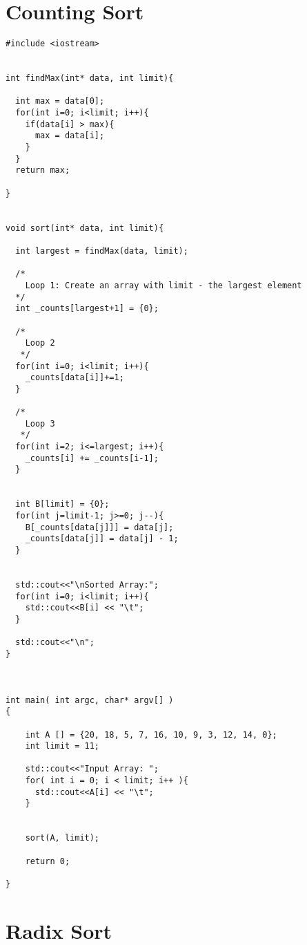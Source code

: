 \documentclass{article}
\begin{document}
\section{Counting Sort}
\begin{verbatim}
#include <iostream>


int findMax(int* data, int limit){

  int max = data[0];
  for(int i=0; i<limit; i++){
    if(data[i] > max){
      max = data[i];
    }
  }
  return max;
  
}


void sort(int* data, int limit){

  int largest = findMax(data, limit);

  /*
    Loop 1: Create an array with limit - the largest element
  */
  int _counts[largest+1] = {0};

  /*
    Loop 2
   */
  for(int i=0; i<limit; i++){
    _counts[data[i]]+=1;
  }

  /*
    Loop 3
   */
  for(int i=2; i<=largest; i++){
    _counts[i] += _counts[i-1];
  }


  int B[limit] = {0};
  for(int j=limit-1; j>=0; j--){
    B[_counts[data[j]]] = data[j];
    _counts[data[j]] = data[j] - 1;
  }


  std::cout<<"\nSorted Array:";
  for(int i=0; i<limit; i++){
    std::cout<<B[i] << "\t";
  }

  std::cout<<"\n";
}



int main( int argc, char* argv[] )
{

    int A [] = {20, 18, 5, 7, 16, 10, 9, 3, 12, 14, 0};
    int limit = 11;

    std::cout<<"Input Array: ";
    for( int i = 0; i < limit; i++ ){
      std::cout<<A[i] << "\t";
    }      


    sort(A, limit);
    
    return 0;
    
}
\end{verbatim}

\section{Radix Sort}
\end{document}
